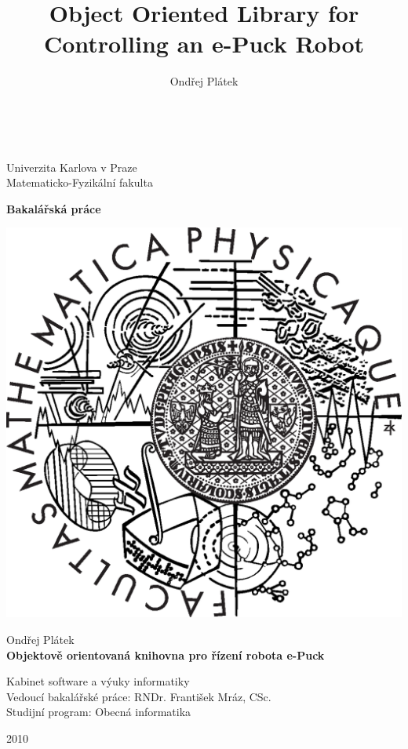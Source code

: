 \documentclass[12pt,notitlepage]{report}
\title{Object Oriented Library for Controlling an e-Puck Robot}
\author{Ondřej Plátek}
\begin{document}
\begin{titlepage}
\begin{center}
\ \\

\vspace{15mm}

\large
Univerzita Karlova v Praze\\
Matematicko-Fyzikální fakulta\\

\vspace{5mm}

{\Large\bf Bakalářská práce}

\vspace{10mm}

\includegraphics[scale=0.3]{logo.eps} %

\vspace{15mm}
{\Large Ondřej Plátek}\\ %

\vspace{5mm}
{\Large\bf Objektově orientovaná knihovna pro řízení robota e-Puck}

\vspace{20mm}
\large
\noindent
Kabinet software a výuky informatiky \\
\noindent
 Vedoucí bakalářské práce: RNDr. František Mráz, CSc.\\
 Studijní program: Obecná informatika\\
\end{center}
\vspace{20mm}
\begin{center}
2010 
\end{center}

\end{titlepage} %
\end{document}
